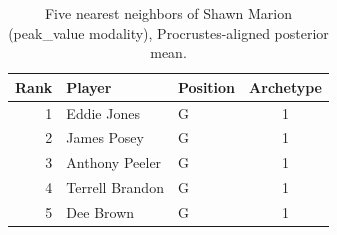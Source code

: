 \begin{table}[htbp]
  \centering\small
  \begin{tabular}{rllc}
    \toprule
    Rank & Player & Position & Archetype \\
    \midrule
    1 & Eddie Jones & G & 1 \\
    2 & James Posey & G & 1 \\
    3 & Anthony Peeler & G & 1 \\
    4 & Terrell Brandon & G & 1 \\
    5 & Dee Brown & G & 1 \\
    \bottomrule
  \end{tabular}
  \caption{Five nearest neighbors of Shawn Marion (peak_value modality), Procrustes-aligned posterior mean.}
  \label{tab:Shawn_Marion_neighbors_peak_value}
\end{table}


